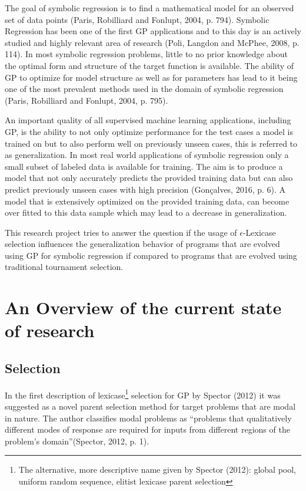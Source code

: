 \documentclass[
  12pt,
]{article}
\begin{document}
The goal of symbolic regression is to find a mathematical model for an
observed set of data points (Paris, Robilliard and Fonlupt, 2004, p.
794). Symbolic Regression has been one of the first GP applications and
to this day is an actively studied and highly relevant area of research
(Poli, Langdon and McPhee, 2008, p. 114). In most symbolic regression
problems, little to no prior knowledge about the optimal form and
structure of the target function is available. The ability of GP to
optimize for model structure as well as for parameters has lead to it
being one of the most prevalent methods used in the domain of symbolic
regression (Paris, Robilliard and Fonlupt, 2004, p. 795).

An important quality of all supervised machine learning applications,
including GP, is the ability to not only optimize performance for the
test cases a model is trained on but to also perform well on previously
unseen cases, this is referred to as generalization. In most real world
applications of symbolic regression only a small subset of labeled data
is available for training. The aim is to produce a model that not only
accurately predicts the provided training data but can also predict
previously unseen cases with high precision (Gonçalves, 2016, p. 6). A
model that is extensively optimized on the provided training data, can
become over fitted to this data sample which may lead to a decrease in
generalization.

This research project tries to answer the question if the usage of
\(\epsilon\)-Lexicase selection influences the generalization behavior
of programs that are evolved using GP for symbolic regression if
compared to programs that are evolved using traditional tournament
selection.

\hypertarget{an-overview-of-the-current-state-of-research}{%
\section{An Overview of the current state of
research}\label{an-overview-of-the-current-state-of-research}}

\hypertarget{selection}{%
\subsection{Selection}\label{selection}}

In the first description of lexicase\footnote{The alternative, more
  descriptive name given by Spector (2012): global pool, uniform random
  sequence, elitist lexicase parent selection} selection for GP by
Spector (2012) it was suggested as a novel parent selection method for
target problems that are modal in nature. The author classifies modal
problems as ``problems that qualitatively different modes of response
are required for inputs from different regions of the problem's
domain''(Spector, 2012, p. 1).
\end{document}

